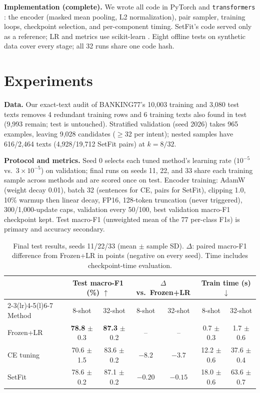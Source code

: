 \documentclass{article}
\begin{document}
\textbf{Implementation (complete).} We wrote all code in PyTorch \citep{paszke2019pytorch} and \texttt{transformers} \citep{wolf2020transformers}: the encoder (masked mean pooling, L2 normalization), pair sampler, training loops, checkpoint selection, and per-component timing. SetFit's code \citep{setfit2026} served only as a reference; LR and metrics use scikit-learn \citep{pedregosa2011scikit}. Eight offline tests on synthetic data cover every stage; all 32 runs share one code hash.

\section{Experiments}
\textbf{Data.} Our exact-text audit of BANKING77's 10,003 training and 3,080 test texts \citep{casanueva2020efficient,polyai2020banking77} removes 4 redundant training rows and 6 training texts also found in test (9,993 remain; test is untouched). Stratified validation (seed 2026) takes 965 examples, leaving 9,028 candidates ($\geq$32 per intent); nested samples have 616/2,464 texts (4,928/19,712 SetFit pairs) at $k=8/32$.

\textbf{Protocol and metrics.} Seed 0 selects each tuned method's learning rate ($10^{-5}$ vs.\ $3\times10^{-5}$) on validation; final runs on seeds 11, 22, and 33 share each training sample across methods and are scored once on test. Encoder training: AdamW (weight decay 0.01), batch 32 (sentences for CE, pairs for SetFit), clipping 1.0, 10\% warmup then linear decay, FP16, 128-token truncation (never triggered), 300/1,000-update caps, validation every 50/100, best validation macro-F1 checkpoint kept. Test macro-F1 (unweighted mean of the 77 per-class F1s) is primary and accuracy secondary.

\begin{table}[H]
\centering
\caption{Final test results, seeds 11/22/33 (mean $\pm$ sample SD). $\Delta$: paired macro-F1 difference from Frozen+LR in points (negative on every seed). Time includes checkpoint-time evaluation.}
\label{tab:models}
\small
\begin{tabular}{@{}lcccccc@{}}
\toprule
& \multicolumn{2}{c}{Test macro-F1 (\%) $\uparrow$} & \multicolumn{2}{c}{$\Delta$ vs.\ Frozen+LR} & \multicolumn{2}{c}{Train time (s) $\downarrow$} \\
\cmidrule(lr){2-3}\cmidrule(lr){4-5}\cmidrule(l){6-7}
Method & 8-shot & 32-shot & 8-shot & 32-shot & 8-shot & 32-shot \\
\midrule
Frozen+LR & \textbf{78.8} $\pm$ 0.3 & \textbf{87.3} $\pm$ 0.2 & -- & -- & 0.7 $\pm$ 0.3 & 1.7 $\pm$ 0.6 \\
CE tuning & 70.6 $\pm$ 1.5 & 83.6 $\pm$ 0.2 & $-8.2$ & $-3.7$ & 12.2 $\pm$ 0.6 & 37.6 $\pm$ 0.4 \\
SetFit & 78.6 $\pm$ 0.2 & 87.1 $\pm$ 0.2 & $-0.20$ & $-0.15$ & 18.0 $\pm$ 0.6 & 63.6 $\pm$ 0.7 \\
\bottomrule
\end{tabular}
\end{table}
\end{document}
